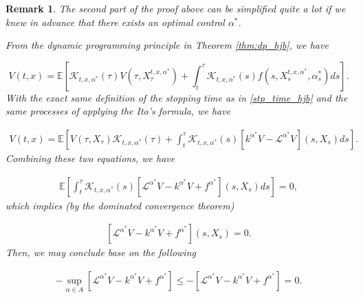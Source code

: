 \documentclass{article}
\newtheorem{rk}{Remark}
\begin{document}
\begin{rk}
The second part of the proof above can be simplified quite a lot if we knew in advance that there exists an optimal control $\alpha^*$. 

From the dynamic programming principle in Theorem \ref{thm:dp_hjb}, we have 

\begin{equation*}
V(t,x)=\mathbb{E}\left[\mathcal{K}_{t,x,\alpha^*}(\tau)V(\tau,X_\tau^{t,x,\alpha^*})+\int^\tau_t\mathcal{K}_{t,x,\alpha^*}(s)f(s,X_s^{t,x,\alpha^*},\alpha^*_s)ds\right].
\end{equation*}
With the exact same definition of the stopping time as in \eqref{stp_time_hjb} and the same processes of applying the Ito's formula, we have

\begin{equation*}
\begin{aligned}
V(t,x)=\mathbb{E}\left[V(\tau,X_\tau)\mathcal{K}_{t,x,\alpha^*}(\tau)+\int^\tau_t\mathcal{K}_{t,x,\alpha^*}(s)[k^{\alpha^*}V-\mathcal{L}^{\alpha^*}V](s,X_s)ds\right].
\end{aligned}
\end{equation*}
Combining these two equations, we have

\begin{equation*}
\begin{aligned}
\mathbb{E}\left[\int^\tau_t\mathcal{K}_{t,x,\alpha^*}(s)[\mathcal{L}^{\alpha^*}V-k^{\alpha^*}V+f^{\alpha^*}](s,X_s)ds\right]=0,
\end{aligned}
\end{equation*}
which implies (by the dominated convergence theorem)

\begin{equation*}
\begin{aligned}
[\mathcal{L}^{\alpha^*}V-k^{\alpha^*}V+f^{\alpha^*}](s,X_s)=0.
\end{aligned}
\end{equation*}
 Then, we may conclude base on the following

\begin{equation*}
\begin{aligned}
-\sup_{\alpha\in A}[\mathcal{L}^{\alpha^*}V-k^{\alpha^*}V+f^{\alpha^*}]\leq-[\mathcal{L}^{\alpha^*}V-k^{\alpha^*}V+f^{\alpha^*}]=0.
\end{aligned}
\end{equation*}

\end{rk}
\end{document}

